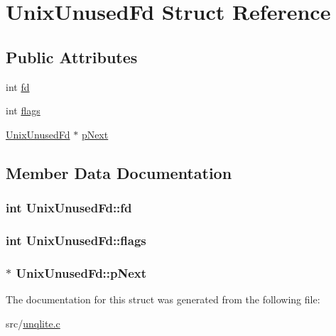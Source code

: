 \hypertarget{struct_unix_unused_fd}{\section{Unix\-Unused\-Fd Struct Reference}
\label{dd/d77/struct_unix_unused_fd}
}
\subsection*{Public Attributes}
\begin{DoxyCompactItemize}
\item 
int \hyperlink{struct_unix_unused_fd_a3f1a6127218af971aeb7b131c9c1600d}{fd}
\item 
int \hyperlink{struct_unix_unused_fd_a744cd118bd91ec2019108e8205708684}{flags}
\item 
\hyperlink{struct_unix_unused_fd}{Unix\-Unused\-Fd} $\ast$ \hyperlink{struct_unix_unused_fd_a6bbcba75beeabdd2df126638bc1d8bc0}{p\-Next}
\end{DoxyCompactItemize}


\subsection{Member Data Documentation}
\hypertarget{struct_unix_unused_fd_a3f1a6127218af971aeb7b131c9c1600d}{
\subsubsection[{fd}]{\setlength{\rightskip}{0pt plus 5cm}int Unix\-Unused\-Fd\-::fd}}\label{dd/d77/struct_unix_unused_fd_a3f1a6127218af971aeb7b131c9c1600d}
\hypertarget{struct_unix_unused_fd_a744cd118bd91ec2019108e8205708684}{
\subsubsection[{flags}]{\setlength{\rightskip}{0pt plus 5cm}int Unix\-Unused\-Fd\-::flags}}\label{dd/d77/struct_unix_unused_fd_a744cd118bd91ec2019108e8205708684}
\hypertarget{struct_unix_unused_fd_a6bbcba75beeabdd2df126638bc1d8bc0}{
\subsubsection[{p\-Next}]{$\ast$ Unix\-Unused\-Fd\-::p\-Next}}\label{dd/d77/struct_unix_unused_fd_a6bbcba75beeabdd2df126638bc1d8bc0}


The documentation for this struct was generated from the following file\-:\begin{DoxyCompactItemize}
\item 
src/\hyperlink{unqlite_8c}{unqlite.\-c}\end{DoxyCompactItemize}

